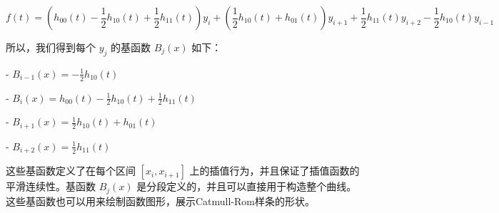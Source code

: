 \documentclass[11pt]{article}
\begin{document}
    \[
    f(t) = \left( h_{00}(t) - \frac{1}{2} h_{10}(t) + \frac{1}{2} h_{11}(t) \right) y_i + \left( \frac{1}{2} h_{10}(t) + h_{01}(t) \right) y_{i+1} + \frac{1}{2} h_{11}(t) y_{i+2} - \frac{1}{2} h_{10}(t) y_{i-1}
    \]
    
    所以，我们得到每个 \(y_j\) 的基函数 \(B_j(x)\) 如下：
    
    - \( B_{i-1}(x) = -\frac{1}{2} h_{10}(t) \)

    - \( B_i(x) = h_{00}(t) - \frac{1}{2} h_{10}(t) + \frac{1}{2} h_{11}(t) \)

    - \( B_{i+1}(x) = \frac{1}{2} h_{10}(t) + h_{01}(t) \)
    
    - \( B_{i+2}(x) = \frac{1}{2} h_{11}(t) \)
    
    这些基函数定义了在每个区间 \([x_i, x_{i+1}]\) 上的插值行为，并且保证了插值函数的平滑连续性。基函数 \(B_j(x)\) 是分段定义的，并且可以直接用于构造整个曲线。这些基函数也可以用来绘制函数图形，展示Catmull-Rom样条的形状。
\end{document}
